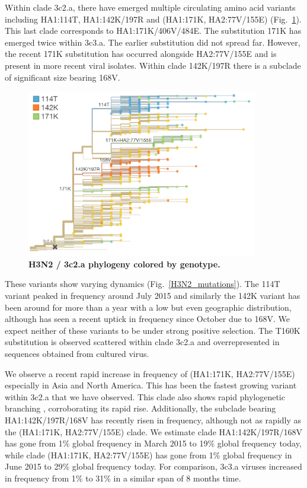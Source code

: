 \documentclass[11pt,oneside,letterpaper]{article}
\begin{document}
\pagebreak

Within clade 3c2.a, there have emerged multiple circulating amino acid variants including HA1:114T, HA1:142K/197R and (HA1:171K, HA2:77V/155E) (Fig.\ \ref{H3N2_3c2a_tree}). This last clade corresponds to HA1:171K/406V/484E. The substitution 171K has emerged twice within 3c3.a. The earlier substitution did not spread far. However, the recent 171K substitution has occurred alongside HA2:77V/155E and is present in more recent viral isolates. Within clade 142K/197R there is a subclade of significant size bearing 168V.

\begin{figure}[H]
	\centering		
	\includegraphics[width=0.9\textwidth]{../figures/feb-2016/H3N2_3c2a_tree.png}
	\caption{\textbf{H3N2 / 3c2.a phylogeny colored by genotype.} 
	}
	\label{H3N2_3c2a_tree}
\end{figure}

These variants show varying dynamics (Fig.\ \ref{H3N2_mutations}). The 114T variant peaked in frequency around July 2015 and similarly the 142K variant has been around for more than a year with a low but even geographic distribution, although has seen a recent uptick in frequency since October due to 168V. We expect neither of these variants to be under strong positive selection. The T160K substitution is observed scattered within clade 3c2.a and overrepresented in sequences obtained from cultured virus.

We observe a recent rapid increase in frequency of (HA1:171K, HA2:77V/155E) especially in Asia and North America. This has been the fastest growing variant within 3c2.a that we have observed. This clade also shows rapid phylogenetic branching \cite{neher2014predicting}, corroborating its rapid rise. Additionally, the subclade bearing HA1:142K/197R/168V has recently risen in frequency, although not as rapidly as the (HA1:171K, HA2:77V/155E) clade. We estimate clade HA1:142K/197R/168V has gone from 1\% global frequency in March 2015 to 19\% global frequency today, while clade (HA1:171K, HA2:77V/155E) has gone from 1\% global frequency in June 2015 to 29\% global frequency today. For comparison, 3c3.a viruses increased in frequency from 1\% to 31\% in a similar span of 8 months time.
\end{document}
